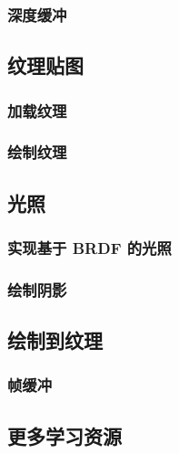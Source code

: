 \documentclass[fontset=windows]{ctexart}
\begin{document}
\subsubsection{深度缓冲}

\subsection{纹理贴图}

\subsubsection{加载纹理}

\subsubsection{绘制纹理}

\subsection{光照}

\subsubsection{实现基于 BRDF 的光照}

\subsubsection{绘制阴影}

\subsection{绘制到纹理}

\subsubsection{帧缓冲}

\subsection{更多学习资源}
\end{document}
